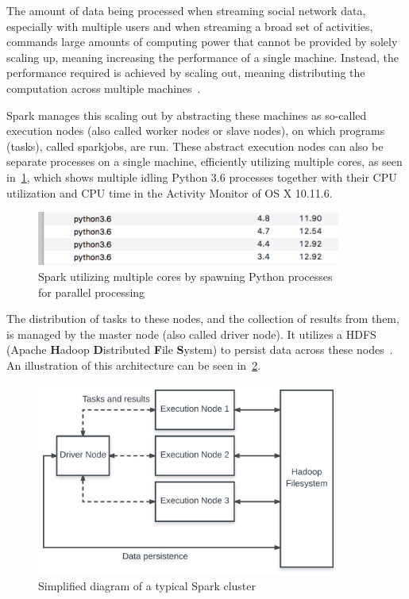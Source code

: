 The amount of data being processed when streaming social network data,
especially with multiple users and when streaming a broad set of activities,
commands large amounts of computing power that cannot be provided by solely scaling up,
meaning increasing the performance of a single machine.
Instead, the performance required is achieved by scaling out,
meaning distributing the computation across multiple machines~\cite{Wolke2010}.

Spark manages this scaling out by abstracting these machines as so-called execution nodes (also called worker nodes or slave nodes),
on which programs (tasks), called sparkjobs, are run.
These abstract execution nodes can also be separate processes on a single machine,
efficiently utilizing multiple cores, as seen in~\cref{fig:spark_processes},
which shows multiple idling Python 3.6 processes together with their CPU utilization and CPU time
in the Activity Monitor of OS X 10.11.6.

\begin{figure}
    \centering
    \caption{Spark utilizing multiple cores by spawning Python processes \\for parallel processing}
    \label{fig:spark_processes}
    \includegraphics[width=10cm]{../images/python_processes.png}
\end{figure}

The distribution of tasks to these nodes, and the collection of results from them,
is managed by the master node (also called driver node).
It utilizes a HDFS (Apache \textbf{H}adoop \textbf{D}istributed \textbf{F}ile \textbf{S}ystem) to persist data across these nodes~\cite{Zaharia2016}.
An illustration of this architecture can be seen in~\cref{fig:spark}.

\begin{figure}
    \centering
    \caption{Simplified diagram of a typical Spark cluster}
    \label{fig:spark}
    \includegraphics[width=10cm]{../figures/spark.pdf}
\end{figure}

